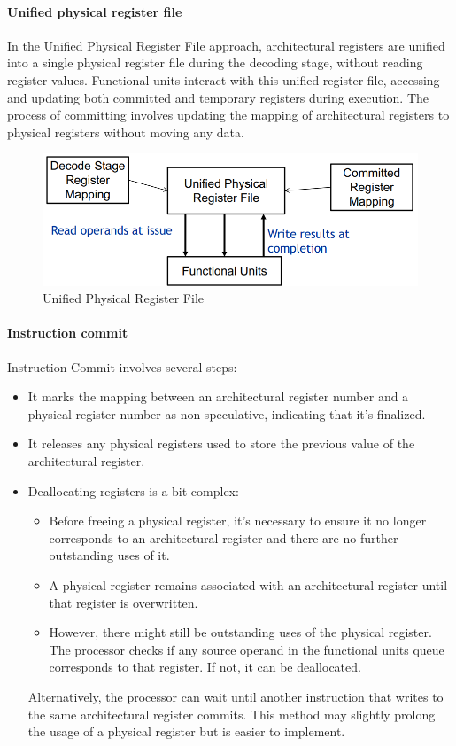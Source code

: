 \paragraph*{Unified physical register file}
In the Unified Physical Register File approach, architectural registers are unified into a single physical register file during the decoding stage, without reading register values. 
Functional units interact with this unified register file, accessing and updating both committed and temporary registers during execution. 
The process of committing involves updating the mapping of architectural registers to physical registers without moving any data.
\begin{figure}[H]
    \centering
    \includegraphics[width=0.4\linewidth]{images/uprf.png}
    \caption{Unified Physical Register File}
\end{figure}

\paragraph*{Instruction commit}
Instruction Commit involves several steps:
\begin{itemize}
    \item It marks the mapping between an architectural register number and a physical register number as non-speculative, indicating that it's finalized.
    \item It releases any physical registers used to store the previous value of the architectural register.
    \item Deallocating registers is a bit complex:
        \begin{itemize}
            \item Before freeing a physical register, it's necessary to ensure it no longer corresponds to an architectural register and there are no further outstanding uses of it.
            \item A physical register remains associated with an architectural register until that register is overwritten.
            \item However, there might still be outstanding uses of the physical register. The processor checks if any source operand in the functional units queue corresponds to that register. If not, it can be deallocated.
        \end{itemize}
        Alternatively, the processor can wait until another instruction that writes to the same architectural register commits. This method may slightly prolong the usage of a physical register but is easier to implement.
\end{itemize}

